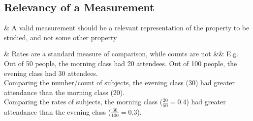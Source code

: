 \subsection{Relevancy of a Measurement}
	\label{subsec:measurement-of-data:relevancy-of-a-measurement}
\begin{easylist}

	& A valid measurement should be a relevant representation of the property to be studied, and not some other property

	& Rates are a standard measure of comparison, while counts are not
		&& E.g. Out of 50 people, the morning class had 20 attendees. Out of 100 people, the evening class had 30 attendees. \smallskip \\
		Comparing the number/count of subjects, the evening class (30) had greater attendance than the morning class (20). \\
		Comparing the rates of subjects, the morning class ($\frac{20}{50} = 0.4$) had greater attendance than the evening class ($\frac{30}{100} = 0.3$).

\end{easylist}
\clearpage
